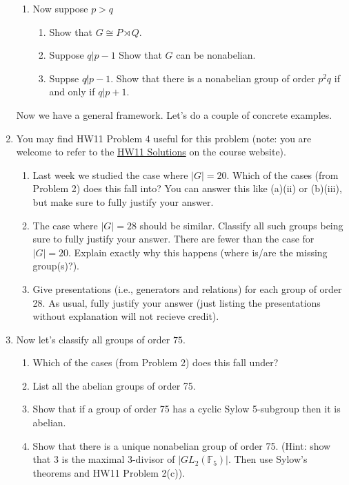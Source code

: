 \documentclass[11pt]{article}
\newcommand{\bF}{\mathbb{F}}
\begin{document}
\begin{enumerate}
{\begin{enumerate}
{\begin{enumerate}
{      }
    \end{enumerate}
    }
    \item{
    Now suppose $p>q$
    \begin{enumerate}
      \item{
      Show that $G\cong P\rtimes Q$.
      }
      \item{
      Suppose $q|p-1$  Show that $G$ can be nonabelian.
      }
      \item{
      Suppse $q\not|p-1$.  Show that there is a nonabelian group of order $p^2q$ if and only if $q|p+1$.
      }
    \end{enumerate}
    }
  \end{enumerate}
  }
  Now we have a general framework.  Let's do a couple of concrete examples.
  \item{
  You may find HW11 Problem 4 useful for this problem (note: you are welcome to refer to the \href{http://www.gabrieldorfsmanhopkins.com/m113sp20/HW11Solutions.pdf}{HW11 Solutions} on the course website).
  \begin{enumerate}
    \item{
    Last week we studied the case where $|G| = 20$.  Which of the cases (from Problem 2) does this fall into?  You can answer this like (a)(ii) or (b)(iii), but make sure to fully justify your answer.
    }
    \item{
    The case where $|G| = 28$ should be similar.  Classify all such groups being sure to fully justify your answer.  There are fewer than the case for $|G|=20$.  Explain exactly why this happens (where is/are the missing group(s)?).
    }
    \item{
    Give presentations (i.e., generators and relations) for each group of order 28.  As usual, fully justify your answer (just listing the presentations without explanation will not recieve credit).
    }
  \end{enumerate}
  }
  \item{
  Now let's classify all groups of order $75$.
  \begin{enumerate}
    \item{
    Which of the cases (from Problem 2) does this fall under?
    }
    \item{
    List all the abelian groups of order 75.
    }
    \item{
    Show that if a group of order 75 has a cyclic Sylow 5-subgroup then it is abelian.
    }
    \item{
    Show that there is a unique nonabelian group of order 75.  (Hint: show that $3$ is the maximal $3$-divisor of $|GL_2(\bF_5)|$.  Then use Sylow's theorems and HW11 Problem 2(c)).
    }
  \end{enumerate}
  }
\end{enumerate}
\end{document}
